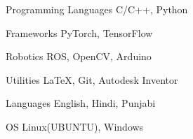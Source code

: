 

\begin{cvskills}

  \cvskill
    {Programming Languages} %
    {C/C++, Python} %


  \cvskill
    {Frameworks} %
    {PyTorch, TensorFlow} %
    
  \cvskill
    {Robotics} %
    {ROS, OpenCV, Arduino} %

  \cvskill
    {Utilities} %
    {\LaTeX, Git, Autodesk Inventor} %

  \cvskill
    {Languages} %
    {English, Hindi, Punjabi} %

  \cvskill
    {OS} %
    {Linux(UBUNTU), Windows} %

\end{cvskills}